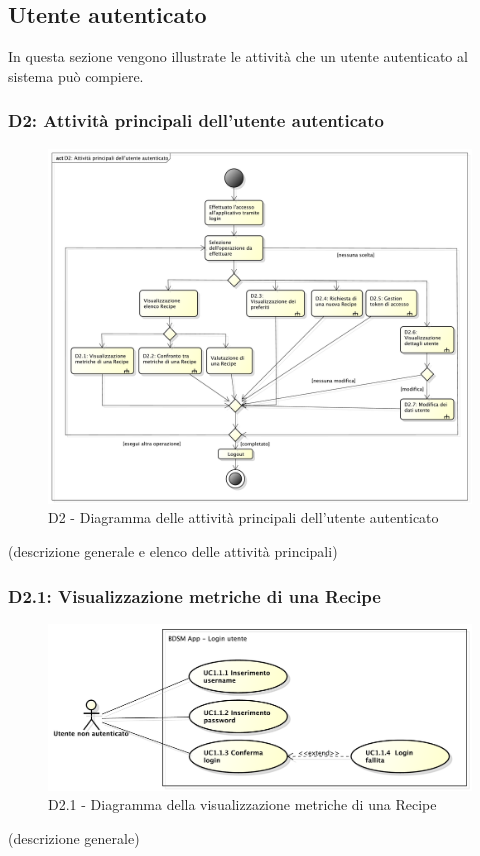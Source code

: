 	\subsection{Utente autenticato} %
	\label{sub:utente_autenticato}
	In questa sezione vengono illustrate le attività che un utente autenticato al sistema può compiere.
		\subsubsection{D2: Attività principali dell'utente autenticato} %
		\label{ssub:attivita_principali_dell_utente_autenticato}
		\begin{figure}[!htbp]
			\centering
			\centerline{\includegraphics[scale=0.41]{./images/D2.pdf}}
			\caption{D2 - Diagramma delle attività principali dell'utente autenticato}
		\end{figure}
		\noindent
		[TO DO] (descrizione generale e elenco delle attività principali)


		\subsubsection{D2.1: Visualizzazione metriche di una Recipe} %
		\label{ssub:visualizzazione_metriche_di_una_recipe}
		\label{ssub:registrazione_al_sistema}
		\begin{figure}[!htbp]
			\centering
			\centerline{\includegraphics[scale=0.45]{./images/UC1_1.pdf}}
			\caption{D2.1 - Diagramma della visualizzazione metriche di una Recipe}
		\end{figure}
		\noindent
		[TO DO] (descrizione generale)

